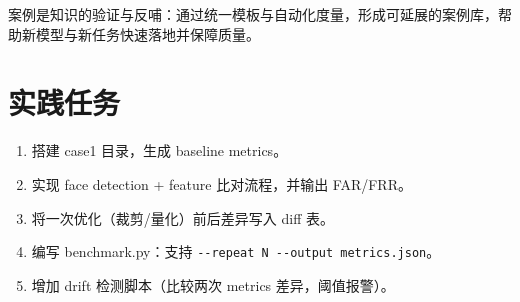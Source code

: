 案例是知识的验证与反哺：通过统一模板与自动化度量，形成可延展的案例库，帮助新模型与新任务快速落地并保障质量。

\section{实践任务}\label{ux5b9eux8df5ux4efbux52a1}

\begin{enumerate}
\def\labelenumi{\arabic{enumi}.}
\tightlist
\item
  搭建 case1 目录，生成 baseline metrics。
\item
  实现 face detection + feature 比对流程，并输出 FAR/FRR。
\item
  将一次优化（裁剪/量化）前后差异写入 diff 表。
\item
  编写 benchmark.py：支持
  \passthrough{\lstinline!--repeat N --output metrics.json!}。
\item
  增加 drift 检测脚本（比较两次 metrics 差异，阈值报警）。
\end{enumerate}
